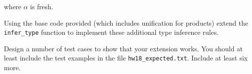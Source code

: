 \documentclass[11pt]{article}
\begin{document}
{\hspace{.25in}} where $\alpha$ is fresh.
\vspace{.125in}\\


\begin{exercise}
Using the base code provided (which includes unification for products) extend
the {\tt{infer\_type}} function to implement these additional type inference
rules.
\end{exercise}


\begin{exercise}
Design a number of test cases to show that your extension works.  You should at least include the test  examples in the file {\tt{hw18\_expected.txt}}.  Include at least six more.
\end{exercise}
\end{document}
